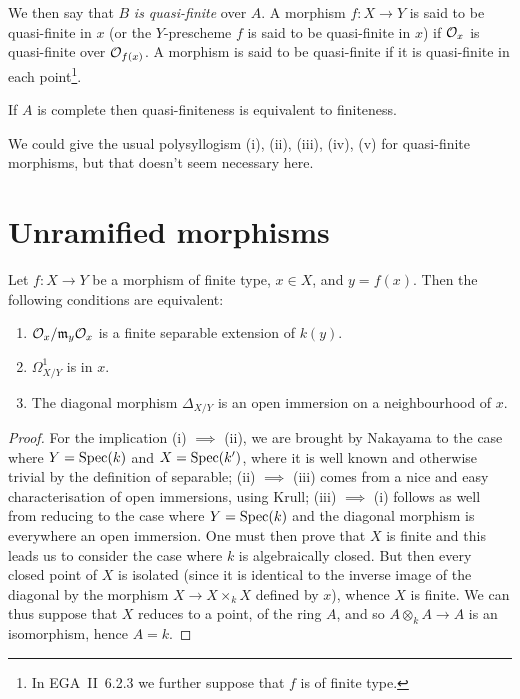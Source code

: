 We then say that $B$ \emph{is quasi-finite} over $A$.
A morphism $f\colon X\to Y$ is said to be quasi-finite in $x$ (or the $Y$-prescheme $f$ is said to be quasi-finite in $x$) if $\mathcal{O}_x$ is quasi-finite over $\mathcal{O}_{f(x)}$.
\completelyunsure
A morphism is said to be quasi-finite if it is quasi-finite in each point\footnote{In EGA~II~6.2.3 we further suppose that $f$ is of finite type.}.

\begin{cor}
    If $A$ is complete then quasi-finiteness is equivalent to finiteness.
\end{cor}

We could give the usual polysyllogism (i), (ii), (iii), (iv), (v) for quasi-finite morphisms, but that doesn't seem necessary here.


\section{Unramified morphisms}

\begin{prop}
    Let $f\colon X\to Y$ be a morphism of finite type, $x\in X$, and $y=f(x)$.
    Then the following conditions are equivalent:
    \begin{enumerate}[\normalfont(i)]
        \item $\mathcal{O}_x/\mathfrak{m}_y\mathcal{O}_x$ is a finite separable extension of $k(y)$.
        \item $\Omega_{X/Y}^1$ is  in $x$.
        \item The diagonal morphism $\Delta_{X/Y}$ is an open immersion on a neighbourhood of $x$.
    \end{enumerate}
\end{prop}

\begin{proof}
    For the implication (i) $\implies$ (ii), we are brought by Nakayama to the case where $Y=\operatorname{Spec}(k)$ and $X=\operatorname{Spec}(k')$, where it is well known and otherwise trivial by the definition of separable; (ii) $\implies$ (iii) comes from a nice and easy characterisation of open immersions, using Krull; (iii) $\implies$ (i) follows as well from reducing to the case where $Y=\operatorname{Spec}(k)$ and the diagonal morphism is everywhere an open immersion.
    One must then prove that $X$ is finite \completelyunsure and this leads us to consider the case where $k$ is algebraically closed.
    But then every closed point of $X$ is isolated (since it is identical to the inverse image of the diagonal by the morphism $X\to X\times_k X$ defined by $x$), whence $X$ is finite.
    We can thus suppose that $X$ reduces to a point, of the ring $A$, and so $A\otimes_k A\to A$ is an isomorphism, hence $A=k$.
\end{proof}

